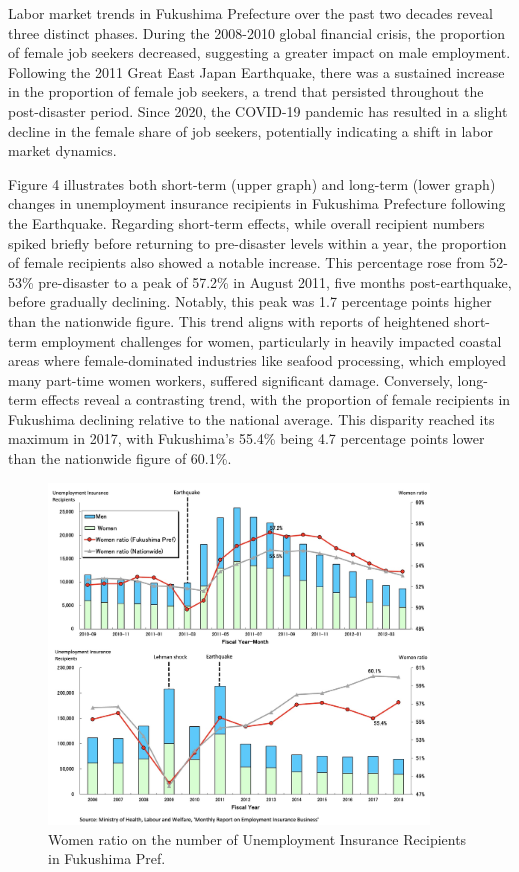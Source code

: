 \documentclass[12pt,halfline,a4paper]{ouparticle}
\begin{document}
\newpage

Labor market trends in Fukushima Prefecture over the past two decades reveal three distinct phases. During the 2008-2010 global financial crisis, the proportion of female job seekers decreased, suggesting a greater impact on male employment. Following the 2011 Great East Japan Earthquake, there was a sustained increase in the proportion of female job seekers, a trend that persisted throughout the post-disaster period. Since 2020, the COVID-19 pandemic has resulted in a slight decline in the female share of job seekers, potentially indicating a shift in labor market dynamics.

\newpage

Figure 4 illustrates both short-term (upper graph) and long-term (lower graph) changes in unemployment insurance recipients in Fukushima Prefecture following the Earthquake. Regarding short-term effects, while overall recipient numbers spiked briefly before returning to pre-disaster levels within a year, the proportion of female recipients also showed a notable increase. This percentage rose from 52-53\% pre-disaster to a peak of 57.2\% in August 2011, five months post-earthquake, before gradually declining. Notably, this peak was 1.7 percentage points higher than the nationwide figure. This trend aligns with reports of heightened short-term employment challenges for women, particularly in heavily impacted coastal areas where female-dominated industries like seafood processing, which employed many part-time women workers, suffered significant damage. Conversely, long-term effects reveal a contrasting trend, with the proportion of female recipients in Fukushima declining relative to the national average. This disparity reached its maximum in 2017, with Fukushima's 55.4\% being 4.7 percentage points lower than the nationwide figure of 60.1\%.


\begin{figure}[h!]
    \centering
    \includegraphics[width=0.9\textwidth]{Number of Actual Unemployment Insurance Recipients2.jpeg}  %
    \caption{Women ratio on the number of Unemployment Insurance Recipients in Fukushima Pref.}
    \label{fig:women_ratio_fukushima}
\end{figure}
\end{document}
